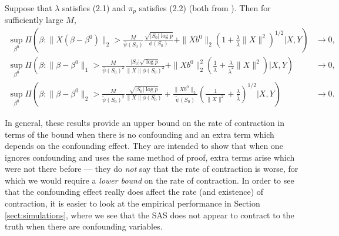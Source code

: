 \documentclass[11pt]{article}
\begin{document}
\begin{theorem}
	Suppose that $\lambda$ satisfies {\color{assumption} (2.1) and $\pi_p$ satisfies (2.2)} (both from \cite{CS-HV2015}). Then for sufficiently large $M$,
\begin{align*}
	\sup_{\beta^0} \Pi\left(\beta: \|X(\beta - \beta^0)\|_2 > \frac{M}{\bar{\psi}(S_0)} \frac{\sqrt{|S_0|\log p}}{\phi(S_0)}  + \|Xb^0\|_2\left(1 + \frac{\lambda}{\bar{\lambda}}\|X\|^2\right)^{1/2}| X, Y \right) &\rightarrow 0, \\
		\sup_{\beta^0} \Pi\left(\beta: \|\beta - \beta^0\|_1 > \frac{M}{\bar{\psi}(S_0)^2} \frac{|S_0|\sqrt{\log p}}{\|X\|\phi(S_0)^2}  + \|Xb^0\|_2^2\left(\frac{1}{\bar{\lambda}} + \frac{\lambda}{\bar{\lambda}^2}\|X\|^2\right) | X, Y \right) &\rightarrow 0, \\
		\sup_{\beta^0} \Pi\left(\beta: \|\beta - \beta^0\|_2 > \frac{M}{\tilde{\psi}(S_0)^2} \frac{\sqrt{|S_0|\log p}}{\|X\|\phi(S_0)}  + \frac{\|Xb^0\|_2}{\tilde{\psi}(S_0)}\left(\frac{1}{\|X\|^2} + \frac{\lambda}{\bar{\lambda}}\right)^{1/2} | X, Y \right) &\rightarrow 0.
\end{align*}
\end{theorem}
In general, these results provide an upper bound on the rate of contraction in terms of the bound when there is no confounding and an extra term which depends on the confounding effect. They are intended to show that when one ignores confounding and uses the same method of proof, extra terms arise which were not there before --- they do {\it not} say that the rate of contraction is worse, for which we would require a {\it lower bound} on the rate of contraction. In order to see that the confounding effect really does affect the rate (and existence) of contraction, it is easier to look at the empirical performance in Section \ref{sect:simulations}, where we see that the SAS does not appear to contract to the truth when there are confounding variables.
\end{document}
